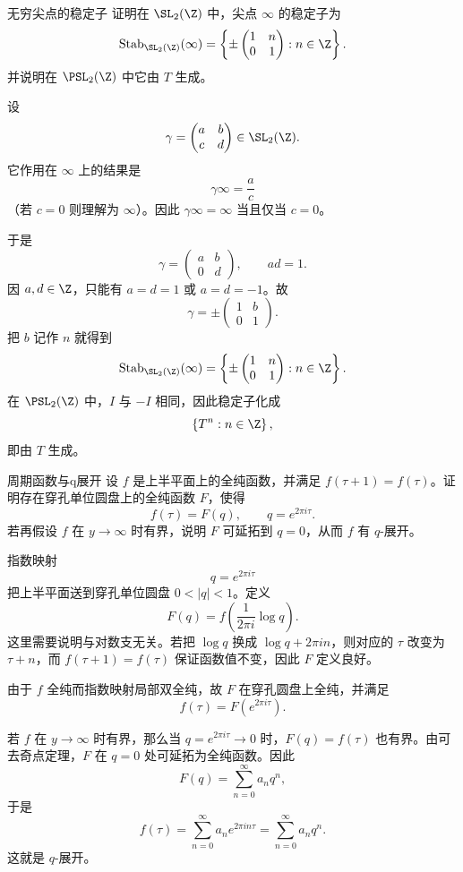 \begin{problem}{无穷尖点的稳定子}
\easy
证明在 $\SL_2(\Z)$ 中，尖点 $\infty$ 的稳定子为
\[
\operatorname{Stab}_{\SL_2(\Z)}(\infty)=
\left\{\pm\begin{pmatrix}1&n\\0&1\end{pmatrix}:n\in\Z\right\}.
\]
并说明在 $\PSL_2(\Z)$ 中它由 $T$ 生成。
\end{problem}
\begin{solution}
设
\[
\gamma=\begin{pmatrix}a&b\\c&d\end{pmatrix}\in \SL_2(\Z).
\]
它作用在 $\infty$ 上的结果是
\[
\gamma\infty=\frac{a}{c}
\]
（若 $c=0$ 则理解为 $\infty$）。因此 $\gamma\infty=\infty$ 当且仅当 $c=0$。

于是
\[
\gamma=\begin{pmatrix}a&b\\0&d\end{pmatrix},\qquad ad=1.
\]
因 $a,d\in\Z$，只能有 $a=d=1$ 或 $a=d=-1$。故
\[
\gamma=\pm\begin{pmatrix}1&b\\0&1\end{pmatrix}.
\]
把 $b$ 记作 $n$ 就得到
\[
\operatorname{Stab}_{\SL_2(\Z)}(\infty)=
\left\{\pm\begin{pmatrix}1&n\\0&1\end{pmatrix}:n\in\Z\right\}.
\]
在 $\PSL_2(\Z)$ 中，$I$ 与 $-I$ 相同，因此稳定子化成
\[
\left\{T^n:n\in\Z\right\},
\]
即由 $T$ 生成。
\end{solution}

\begin{problem}{周期函数与q展开}
\easy
设 $f$ 是上半平面上的全纯函数，并满足 $f(\tau+1)=f(\tau)$。证明存在穿孔单位圆盘上的全纯函数 $F$，使得
\[
f(\tau)=F(q),\qquad q=e^{2\pi i\tau}.
\]
若再假设 $f$ 在 $y\to\infty$ 时有界，说明 $F$ 可延拓到 $q=0$，从而 $f$ 有 $q$-展开。
\end{problem}
\begin{solution}
指数映射
\[
q=e^{2\pi i\tau}
\]
把上半平面送到穿孔单位圆盘 $0<|q|<1$。定义
\[
F(q)=f\!\left(\frac{1}{2\pi i}\log q\right).
\]
这里需要说明与对数支无关。若把 $\log q$ 换成 $\log q+2\pi i n$，则对应的 $\tau$ 改变为 $\tau+n$，而 $f(\tau+1)=f(\tau)$ 保证函数值不变，因此 $F$ 定义良好。

由于 $f$ 全纯而指数映射局部双全纯，故 $F$ 在穿孔圆盘上全纯，并满足
\[
f(\tau)=F(e^{2\pi i\tau}).
\]

若 $f$ 在 $y\to\infty$ 时有界，那么当 $q=e^{2\pi i\tau}\to 0$ 时，$F(q)=f(\tau)$ 也有界。由可去奇点定理，$F$ 在 $q=0$ 处可延拓为全纯函数。因此
\[
F(q)=\sum_{n=0}^{\infty} a_n q^n,
\]
于是
\[
f(\tau)=\sum_{n=0}^{\infty} a_n e^{2\pi i n\tau}=
\sum_{n=0}^{\infty} a_n q^n.
\]
这就是 $q$-展开。
\end{solution}

